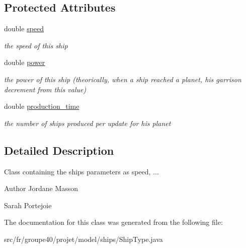 \subsection*{Protected Attributes}
\begin{DoxyCompactItemize}
\item 
\mbox{\label{classfr_1_1groupe40_1_1projet_1_1model_1_1ships_1_1_ship_type_a1b9a8c6f8feb78937126e77eee96fa4f}} 
double \hyperlink{classfr_1_1groupe40_1_1projet_1_1model_1_1ships_1_1_ship_type_a1b9a8c6f8feb78937126e77eee96fa4f}{speed}
\begin{DoxyCompactList}\small\item\em the speed of this ship \end{DoxyCompactList}\item 
\mbox{\label{classfr_1_1groupe40_1_1projet_1_1model_1_1ships_1_1_ship_type_afc4b607b12b6f9b796cc57504f3f09e4}} 
double \hyperlink{classfr_1_1groupe40_1_1projet_1_1model_1_1ships_1_1_ship_type_afc4b607b12b6f9b796cc57504f3f09e4}{power}
\begin{DoxyCompactList}\small\item\em the power of this ship (theorically, when a ship reached a planet, his garrison decrement from this value) \end{DoxyCompactList}\item 
\mbox{\label{classfr_1_1groupe40_1_1projet_1_1model_1_1ships_1_1_ship_type_afdb2d40b32b4369a83794617af567a05}} 
double \hyperlink{classfr_1_1groupe40_1_1projet_1_1model_1_1ships_1_1_ship_type_afdb2d40b32b4369a83794617af567a05}{production\+\_\+time}
\begin{DoxyCompactList}\small\item\em the number of ships produced per update for his planet \end{DoxyCompactList}\end{DoxyCompactItemize}


\subsection{Detailed Description}
Class containing the ships parameters as speed, ... 

\begin{DoxyAuthor}{Author}
Jordane Masson 

Sarah Portejoie 
\end{DoxyAuthor}


The documentation for this class was generated from the following file\+:\begin{DoxyCompactItemize}
\item 
src/fr/groupe40/projet/model/ships/Ship\+Type.\+java\end{DoxyCompactItemize}
